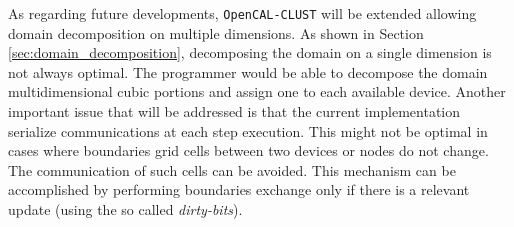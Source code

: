 As regarding future developments, \texttt{OpenCAL-CLUST} will be  extended allowing domain decomposition on multiple dimensions. As shown in Section \ref{sec:domain_decomposition}, decomposing the domain on a single dimension is not always optimal. The programmer would be able to decompose the domain multidimensional cubic portions and assign one to each available device.
Another important issue that will be addressed is that the current implementation serialize communications at each step execution. 
This might not be optimal in cases where boundaries grid cells between two devices or nodes do not change. The communication of such cells can be avoided. This mechanism can be accomplished by performing boundaries exchange only if there is a relevant update (using the so called \textit{dirty-bits}). 


